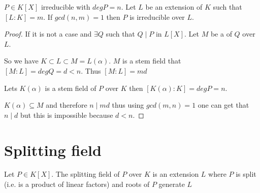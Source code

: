 \begin{corollary}
  $P \in K\left[X\right]$ irreducible with $deg P = n$. Let $L$ be an
  extension of $K$ such that $\left[L:K\right] = m$.
  If $gcd\left(n,m\right) = 1$ then $P$ is irreducible over $L$.
  \label{cor:lec2_2}
  \begin{proof}
    If it is not a case and $\exists Q$ such that $Q \mid P$ in
    $L\left[X\right]$. Let $M$ be a  of $Q$
    over $L$.

    So we have $K \subset L \subset M = L\left(\alpha\right)$. $M$ is
    a stem field that $\left[M:L\right] = deg Q = d < n$. Thus
    $\left[M:L\right] = m d$

    Lets $K\left(\alpha\right)$ is a stem field of $P$ over $K$ then
    $\left[K\left(\alpha\right):K\right] = deg P = n$.

    $K\left(\alpha\right) \subseteq M$ and therefore $n \mid md$ thus
    using $gcd(m,n)=1$ one can get that $n \mid d$ but this is
    impossible because $d < n$.
  \end{proof}
\end{corollary}


\section{Splitting field}

\begin{definition}
  Let $P \in K\left[X\right]$.
  The splitting field of $P$ over $K$ is an extension $L$ where $P$ is
  split (i.e. is a product of linear factors) and roots of $P$
  generate $L$
  \label{def:splittingfield}
\end{definition}

